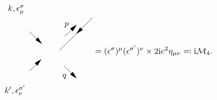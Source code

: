\begin{equation}
\begin{gathered}
\begin{tikzpicture}[x=0.75pt,y=0.75pt,yscale=-1,xscale=1]
            \draw    (216,113) -- (164,165) ;
            \draw [shift={(190,139)}, rotate = 315] [fill={rgb, 255:red, 0; green, 0; blue, 0 }  ][line width=0.08]  [draw opacity=0] (12,-3) -- (0,0) -- (12,3) -- cycle    ;
            \draw    (171,190) -- (189.59,208.59) ;
            \draw [shift={(191,210)}, rotate = 225] [fill={rgb, 255:red, 0; green, 0; blue, 0 }  ][line width=0.08]  [draw opacity=0] (12,-3) -- (0,0) -- (12,3) -- cycle    ;
            \draw    (172,143) -- (189.59,125.41) ;
            \draw [shift={(191,124)}, rotate = 135] [fill={rgb, 255:red, 0; green, 0; blue, 0 }  ][line width=0.08]  [draw opacity=0] (12,-3) -- (0,0) -- (12,3) -- cycle    ;
            \draw    (116,198) -- (133.59,180.41) ;
            \draw [shift={(135,179)}, rotate = 135] [fill={rgb, 255:red, 0; green, 0; blue, 0 }  ][line width=0.08]  [draw opacity=0] (12,-3) -- (0,0) -- (12,3) -- cycle    ;
            \draw    (116,135) -- (134.59,153.59) ;
            \draw [shift={(136,155)}, rotate = 225] [fill={rgb, 255:red, 0; green, 0; blue, 0 }  ][line width=0.08]  [draw opacity=0] (12,-3) -- (0,0) -- (12,3) -- cycle    ;
            
            \draw (109,108.6) node [anchor=south east] [inner sep=0.75pt]    {$k,\epsilon _{\mu }^{\sigma }$};
            \draw (111,219.4) node [anchor=north east] [inner sep=0.75pt]    {$k',\epsilon _{\nu }^{\sigma '}$};
            \draw (179.5,130.1) node [anchor=south east] [inner sep=0.75pt]    {$p$};
            \draw (176,201.4) node [anchor=north east] [inner sep=0.75pt]    {$q$};
            \end{tikzpicture}                     
    \end{gathered} = (\epsilon^\sigma)^\mu (\epsilon^{\sigma'})^\nu \times 2 \ii e^2 \eta_{\mu \nu} \eqqcolon \ii \mathcal{M}_4. 
\end{equation}